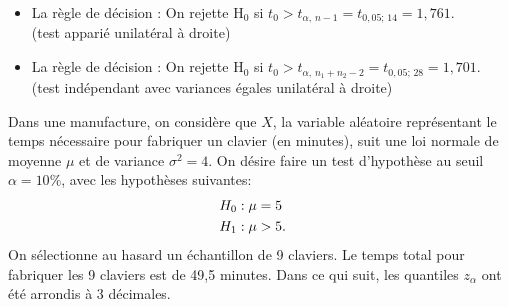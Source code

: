 \begin{questions}
\begin{parts}
\end{parts}

 
\begin{solution}
	\begin{itemize}
		\item La règle de décision : On rejette $\mathrm{H}_0$ si $t_0 > t_{\alpha, \, n-1} = t_{0,05; \, 14} = 1,761$.\\
		(test apparié unilatéral à droite)
		\item La règle de décision : On rejette $\mathrm{H}_0$ si $t_0 > t_{\alpha, \, n_1+n_2-2} = t_{0,05; \, 28} = 1,701$.\\
		(test indépendant avec variances égales unilatéral à droite)
	\end{itemize}
\end{solution}

\newpage
\question\label{puissance}

Dans une manufacture, on considère que $X$, la variable aléatoire représentant le temps nécessaire pour fabriquer un clavier (en minutes), suit une loi normale de moyenne $\mu$ et de variance $\sigma^2=4$. On désire faire un test d'hypothèse au seuil $\alpha=10\%$, avec les hypothèses suivantes:
\begin{align*}
	H_0&: \mu=5\cr
	H_1&: \mu > 5.
\end{align*}
On sélectionne au hasard un échantillon de 9 claviers. Le temps total pour fabriquer les 9 claviers est de 49,5 minutes. Dans ce qui suit, les quantiles $z_\alpha$ ont été arrondis à 3 décimales.

\medskip\medskip
\begin{center}
    

\end{center}
\end{questions}
